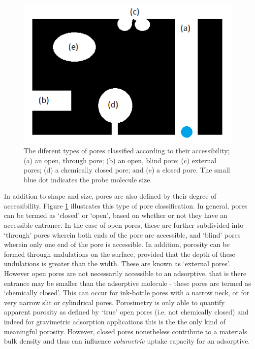 \begin{figure}[b!]
    \centering
    \includegraphics[width=\columnwidth, keepaspectratio]{1-introduction/figs/pore_accessibility.png}
    \caption{The diferent types of pores classified according to their accessibility; (a) an open, through pore; (b) an open, blind pore; (c) external pores; (d) a chemically closed pore; and (e) a closed pore. The small blue dot indicates the probe molecule size.}
    \label{fig:pore_accessibility}
\end{figure}

In addition to shape and size, pores are also defined by their degree of accessibility. Figure \ref{fig:pore_accessibility} illustrates this type of pore classification. In general, pores can be termed as `closed' or `open', based on whether or not they have an accessible entrance. In the case of open pores, these are further subdivided into `through' pores wherein both ends of the pore are accessible, and `blind' pores wherein only one end of the pore is accessible. In addition, porosity can be formed through undulations on the surface, provided that the depth of these undulations is greater than the width. These are known as `external pores'. However open pores are not necessarily accessible to an adsorptive, that is there entrance may be smaller than the adsorptive molecule - these pores are termed as `chemically closed'. This can occur for ink-bottle pores with a narrow neck, or for very narrow slit or cylindrical pores.\citep{rouquerol1994recommendations, kaneko1994determination, zdravkov2007pore} Porosimetry is only able to quantify apparent porosity as defined by `true' open pores (i.e. not chemically closed) and indeed for gravimetric adsorption applications this is the the only kind of meaningful porosity. However, closed pores nonetheless contribute to a materials bulk density and thus can influence \textit{volumetric} uptake capacity for an adsorptive.


